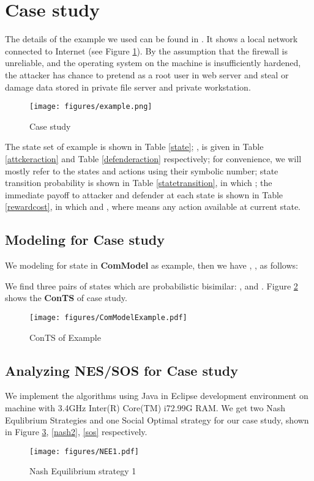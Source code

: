\documentclass{acm_proc_article-sp}
\begin{document}
\section{Case study}
The details of the example we used can be found in \cite{klye}. It shows a local network connected to Internet (see Figure \ref{example}). By the assumption that the firewall is unreliable, and the operating system on the machine is insufficiently hardened, the attacker has chance to pretend as a root user in web server and steal or damage data stored in private file server and private workstation.
\begin{figure}[!htpb]
\begin{center}
\texttt{[image: figures/example.png]}
\caption{Case study}
\label{example}
\end{center}
\end{figure}
The state set  of example is shown in Table \ref{state}; ,  is given in Table \ref{attckeraction} and Table \ref{defenderaction} respectively; for convenience, we will mostly refer to the states and actions using their symbolic number; state transition probability is shown in Table \ref{statetransition}, in which ; the immediate payoff to attacker and defender at each state is shown in Table \ref{rewardcost}, in which  and , where  means any action available at current state.

\subsection{Modeling for Case study}
We modeling for state  in \textbf{ComModel} as example, then we have , ,  as follows:


We find three pairs of states which are probabilistic bisimilar: ,  and . Figure \ref{ComModelcasestudy} shows the \textbf{ConTS} of case study.

\begin{figure}[htpb]
\begin{center}
\texttt{[image: figures/ComModelExample.pdf]}
\caption{ConTS of Example}
\label{ComModelcasestudy}
\end{center}
\end{figure}

\subsection{Analyzing NES/SOS for Case study}
We implement the algorithms using Java in Eclipse development environment on machine with 3.4GHz Inter(R) Core(TM) i72.99G RAM.
We get two Nash Equlibrium Strategies and one Social Optimal strategy for our case study, shown in Figure \ref{nash1}, \ref{nash2}, \ref{sos}  respectively.
\begin{figure}[!htb]
\begin{center}
\texttt{[image: figures/NEE1.pdf]}
\caption{Nash Equilibrium strategy 1}
\label{nash1}
\end{center}
\end{figure}
\end{document}
